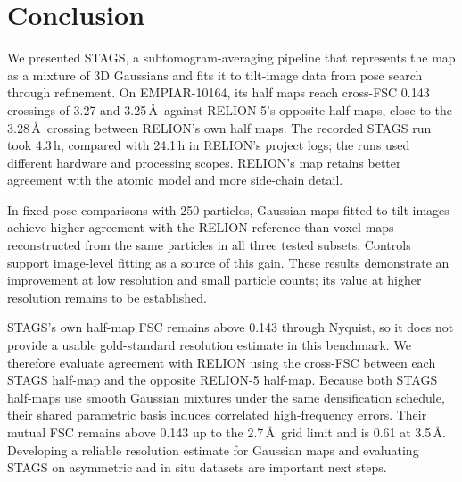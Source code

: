 \section{Conclusion}
\label{sec:conclusion}

We presented STAGS, a subtomogram-averaging pipeline that represents the map as a mixture of 3D Gaussians and fits it to tilt-image data from pose search through refinement. On EMPIAR-10164, its half maps reach cross-FSC 0.143 crossings of 3.27 and 3.25\,\AA\ against RELION-5's opposite half maps, close to the 3.28\,\AA\ crossing between RELION's own half maps. The recorded STAGS run took 4.3\,h, compared with 24.1\,h in RELION's project logs; the runs used different hardware and processing scopes. RELION's map retains better agreement with the atomic model and more side-chain detail.

In fixed-pose comparisons with 250 particles, Gaussian maps fitted to tilt images achieve higher agreement with the RELION reference than voxel maps reconstructed from the same particles in all three tested subsets. Controls support image-level fitting as a source of this gain. These results demonstrate an improvement at low resolution and small particle counts; its value at higher resolution remains to be established.

STAGS's own half-map FSC remains above 0.143 through Nyquist, so it does not provide a usable gold-standard resolution estimate in this benchmark. We therefore evaluate agreement with RELION using the cross-FSC between each STAGS half-map and the opposite RELION-5 half-map. Because both STAGS half-maps use smooth Gaussian mixtures under the same densification schedule, their shared parametric basis induces correlated high-frequency errors. Their mutual FSC remains above 0.143 up to the 2.7\,\AA\ grid limit and is 0.61 at 3.5\,\AA. Developing a reliable resolution estimate for Gaussian maps and evaluating STAGS on asymmetric and in situ datasets are important next steps.